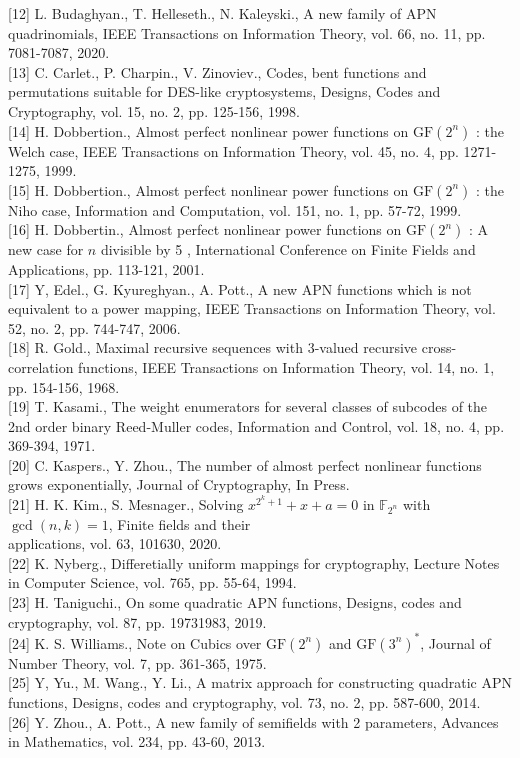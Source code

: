 \documentclass[10pt]{article}
\begin{document}
[12] L. Budaghyan., T. Helleseth., N. Kaleyski., A new family of APN quadrinomials, IEEE Transactions on Information Theory, vol. 66, no. 11, pp. 7081-7087, 2020.\\[0pt]
[13] C. Carlet., P. Charpin., V. Zinoviev., Codes, bent functions and permutations suitable for DES-like cryptosystems, Designs, Codes and Cryptography, vol. 15, no. 2, pp. 125-156, 1998.\\[0pt]
[14] H. Dobbertion., Almost perfect nonlinear power functions on $\mathrm{GF}\left(2^{n}\right)$ : the Welch case, IEEE Transactions on Information Theory, vol. 45, no. 4, pp. 1271-1275, 1999.\\[0pt]
[15] H. Dobbertion., Almost perfect nonlinear power functions on $\mathrm{GF}\left(2^{n}\right)$ : the Niho case, Information and Computation, vol. 151, no. 1, pp. 57-72, 1999.\\[0pt]
[16] H. Dobbertin., Almost perfect nonlinear power functions on $\mathrm{GF}\left(2^{n}\right)$ : A new case for $n$ divisible by 5 , International Conference on Finite Fields and Applications, pp. 113-121, 2001.\\[0pt]
[17] Y, Edel., G. Kyureghyan., A. Pott., A new APN functions which is not equivalent to a power mapping, IEEE Transactions on Information Theory, vol. 52, no. 2, pp. 744-747, 2006.\\[0pt]
[18] R. Gold., Maximal recursive sequences with 3-valued recursive cross-correlation functions, IEEE Transactions on Information Theory, vol. 14, no. 1, pp. 154-156, 1968.\\[0pt]
[19] T. Kasami., The weight enumerators for several classes of subcodes of the 2nd order binary Reed-Muller codes, Information and Control, vol. 18, no. 4, pp. 369-394, 1971.\\[0pt]
[20] C. Kaspers., Y. Zhou., The number of almost perfect nonlinear functions grows exponentially, Journal of Cryptography, In Press.\\[0pt]
[21] H. K. Kim., S. Mesnager., Solving $x^{2^{k}+1}+x+a=0$ in $\mathbb{F}_{2^{n}}$ with $\operatorname{gcd}(n, k)=1$, Finite fields and their\\
applications, vol. 63, 101630, 2020.\\[0pt]
[22] K. Nyberg., Differetially uniform mappings for cryptography, Lecture Notes in Computer Science, vol. 765, pp. 55-64, 1994.\\[0pt]
[23] H. Taniguchi., On some quadratic APN functions, Designs, codes and cryptography, vol. 87, pp. 19731983, 2019.\\[0pt]
[24] K. S. Williams., Note on Cubics over $\mathrm{GF}\left(2^{n}\right)$ and $\mathrm{GF}\left(3^{n}\right)^{*}$, Journal of Number Theory, vol. 7, pp. 361-365, 1975.\\[0pt]
[25] Y, Yu., M. Wang., Y. Li., A matrix approach for constructing quadratic APN functions, Designs, codes and cryptography, vol. 73, no. 2, pp. 587-600, 2014.\\[0pt]
[26] Y. Zhou., A. Pott., A new family of semifields with 2 parameters, Advances in Mathematics, vol. 234, pp. 43-60, 2013.
\end{document}
